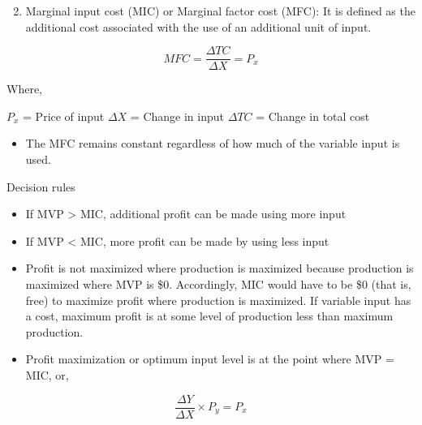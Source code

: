\documentclass[12pt,ignorenonframetext,aspectratio=169]{beamer}
\providecommand{\tightlist}{%
  \setlength{\itemsep}{0pt}\setlength{\parskip}{0pt}}
\begin{document}
\begin{frame}{}
\protect\hypertarget{section}{}
\begin{enumerate}
\setcounter{enumi}{1}
\tightlist
\item
  Marginal input cost (MIC) or Marginal factor cost (MFC): It is defined
  as the additional cost associated with the use of an additional unit
  of input.
\end{enumerate}

\[
MFC = \frac{\Delta TC}{\Delta X} = P_x
\] \footnotesize

Where,

\(P_x\) = Price of input \(\Delta X\) = Change in input \(\Delta TC\) =
Change in total cost

\begin{itemize}
\tightlist
\item
  The MFC remains constant regardless of how much of the variable input
  is used.
\end{itemize}
\end{frame}

\begin{frame}{Decision rules}
\protect\hypertarget{decision-rules}{}
\begin{itemize}
\tightlist
\item
  If MVP \textgreater{} MIC, additional profit can be made using more
  input
\item
  If MVP \textless{} MIC, more profit can be made by using less input
\item
  Profit is not maximized where production is maximized because
  production is maximized where MVP is \$0. Accordingly, MIC would have
  to be \$0 (that is, free) to maximize profit where production is
  maximized. If variable input has a cost, maximum profit is at some
  level of production less than maximum production.
\item
  Profit maximization or optimum input level is at the point where MVP =
  MIC, or,
\end{itemize}

\[
 \frac{\Delta Y}{\Delta X} \times P_y = P_x
\]
\end{frame}
\end{document}

